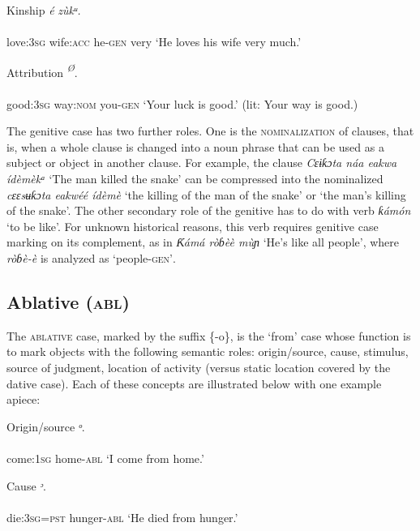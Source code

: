 Kinship
\ea\label{ex:}
\textit{é}\textit{     zùkᵘ.} \\
    \\
love:\textsc{3sg}   wife:\textsc{acc}   he-\textsc{gen}   very
\glt ‘He loves his wife very much.’ 
\z




Attribution
\ea\label{ex:}
\textit{\textsuperscript{Ø}}. \\
    \\
good:\textsc{3sg}   way:\textsc{nom}   you-\textsc{gen}
\glt ‘Your luck is good.’ (lit: Your way is good.) 
\z


The genitive case has two further roles. One is the \textsc{nominalization} of clauses, that is, when a whole clause is changed into a noun phrase that can be used as a subject or object in another clause. For example, the clause \textit{Cɛɨƙɔta náa eakwa ídèmèkᵃ} ‘The man killed the snake’ can be compressed into the nominalized \textit{cɛɛsʉƙɔta eakwéé ídèmè} ‘the killing of the man of the snake’ or ‘the man’s killing of the snake’. The other secondary role of the genitive has to do with verb \textit{ƙámón} ‘to be like’. For unknown historical reasons, this verb requires genitive case marking on its complement, as in \textit{Ƙámá ròɓèè mùɲ} ‘He’s like all people’, where \textit{ròɓè-è} is analyzed as ‘people-\textsc{gen’}.





\subsection{Ablative (\textsc{abl})}


The \textsc{ablative} case, marked by the suffix \{-o\}, is the ‘from’ case whose function is to mark objects with the following semantic roles: origin/source, cause, stimulus, source of judgment, location of activity (versus static location covered by the dative case). Each of these concepts are illustrated below with one example apiece:




Origin/source
\ea\label{ex:}
\textit{ᵒ}. \\
    \\
come:\textsc{1sg}   home-\textsc{abl}
\glt ‘I come from home.’ 
\z




Cause
\ea\label{ex:}
\textit{ᵓ}. \\
    \\
die:\textsc{3sg}=\textsc{pst}     hunger-\textsc{abl}
\glt ‘He died from hunger.’ 
\z




